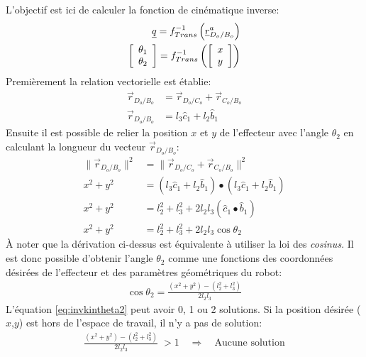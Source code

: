 \begin{example}
L'objectif est ici de calculer la fonction de cinématique inverse:
\begin{align}
\underline{q} = f^{-1}_{Trans}\left( \underline{r}^a_{D_o/B_o} \right) \\
\left[ \begin{array}{c}
\theta_1 \\ \theta_2
 \end{array} \right] 
= f^{-1}_{Trans}\left( \left[ \begin{array}{c }
x \\ y
 \end{array} \right]  \right)
\end{align} 
Premièrement la relation vectorielle est établie:
\begin{align}
\vec{r}_{D_o/B_o} &=  \vec{r}_{D_o/C_o} + \vec{r}_{C_o/B_o} \\
\vec{r}_{D_o/B_o} &=  l_3 \hat{c}_1     + l_2 \hat{b}_1
\end{align} 
Ensuite il est possible de relier la position $x$ et $y$ de l'effecteur avec l'angle $\theta_2$ en calculant la longueur du vecteur $\vec{r}_{D_o/B_o}$:
\begin{align}
\| \vec{r}_{D_o/B_o} \|^2  &=  \| \vec{r}_{D_o/C_o} + \vec{r}_{C_o/B_o} \|^2 \\
x^2 + y^2 &=  (l_3 \hat{c}_1 + l_2 \hat{b}_1) \bullet (l_3 \hat{c}_1+ l_2 \hat{b}_1) \\
x^2 + y^2 &=  l_2^2 + l_3^2 + 2 l_2 l_3 ( \hat{c}_1 \bullet \hat{b}_1 ) \\
x^2 + y^2 &=  l_2^2 + l_3^2 + 2 l_2 l_3 \cos \theta_2
\end{align} 
À noter que la dérivation ci-dessus est équivalente à utiliser la loi des \textit{cosinus}. Il est donc possible d'obtenir l'angle $\theta_2$ comme une fonctions des coordonnées désirées de l'effecteur et des paramètres géométriques du robot:
\begin{align}
\cos \theta_2 = \frac{ (x^2 + y^2) - (l_2^2 + l_3^2) }{2 l_2 l_3}
\label{eq:invkintheta2}
\end{align} 
L'équation \eqref{eq:invkintheta2} peut avoir 0, 1 ou 2 solutions. Si la position désirée ($x$,$y$) est hors de l'espace de travail, il n'y a pas de solution:
\begin{align}
\frac{ (x^2 + y^2) - (l_2^2 + l_3^2)}{2 l_2 l_3} \; > 1 \quad\Rightarrow\quad \text{Aucune solution}
\end{align} 

\end{example}

